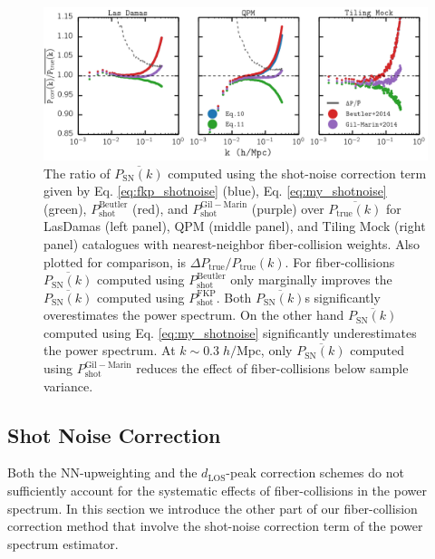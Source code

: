 \documentclass{emulateapj}
\begin{document}
\begin{figure}
\begin{center}
\includegraphics[scale=0.55]{fcpaper_pk_shotnoiseonly_comp.png}
\caption{The ratio of $\overline{P_\mathrm{SN}(k)}$ computed using the shot-noise correction term given by Eq. \ref{eq:fkp_shotnoise} (blue), Eq. \ref{eq:my_shotnoise} (green), $P^\mathrm{Beutler}_\mathrm{shot}$ (red), and $P^{\mathrm{Gil-Marin}}_\mathrm{shot}$ (purple) over $\overline{P_\mathrm{true}(k)}$ for LasDamas (left panel), QPM (middle panel), and Tiling Mock (right panel) catalogues with nearest-neighbor fiber-collision weights. Also plotted for comparison, is $\Delta P_\mathrm{true}/P_\mathrm{true}(k)$. For fiber-collisions  $\overline{P_\mathrm{SN}(k)}$ computed using $P^\mathrm{Beutler}_\mathrm{shot}$ only marginally improves the $\overline{P_\mathrm{SN}(k)}$ computed using $P^\mathrm{FKP}_\mathrm{shot}$. Both $\overline{P_\mathrm{SN}(k)}$s significantly overestimates the power spectrum. On the other hand $\overline{P_\mathrm{SN}(k)}$ computed using Eq. \ref{eq:my_shotnoise} significantly underestimates the power spectrum. At $k \sim 0.3\;h/\mathrm{Mpc}$, only $\overline{P_\mathrm{SN}(k)}$ computed using $P^\mathrm{Gil-Marin}_\mathrm{shot}$ reduces the effect of fiber-collisions below sample variance. } \label{fig:shotnoise}
\end{center}
\end{figure}
\subsection{Shot Noise Correction} \label{sec:shotnoise} 
Both the NN-upweighting and the $d_\mathrm{LOS}$-peak correction schemes do not sufficiently account for the systematic effects of fiber-collisions in the power spectrum. In this section we introduce the other part of our fiber-collision correction method that involve the shot-noise correction term of the power spectrum estimator. 
\end{document}
